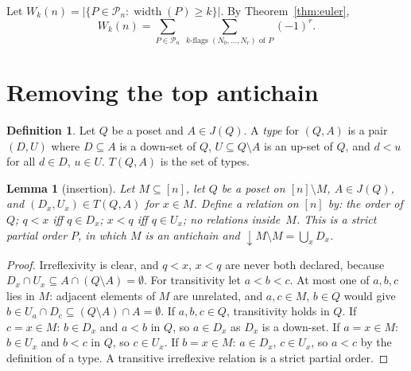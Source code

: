 \documentclass[11pt]{article}
\newtheorem{lemma}[theorem]{Lemma}
\theoremstyle{definition}
\newtheorem{definition}[theorem]{Definition}
\theoremstyle{remark}
\newcommand{\dn}{{\downarrow}}
\newcommand{\cP}{\mathcal{P}}
\DeclareMathOperator{\width}{width}
\begin{document}
Let $W_k(n)=|\{P\in\cP_n:\width(P)\ge k\}|$. By Theorem~\ref{thm:euler},
\begin{equation}\label{eq:W}
  W_k(n)=\sum_{P\in\cP_n}\ \sum_{\text{$k$-flags }(N_0,\dots,N_r)\text{ of }P}(-1)^r .
\end{equation}

\section{Removing the top antichain}

\begin{definition}
Let $Q$ be a poset and $A\in J(Q)$. A \emph{type} for $(Q,A)$ is a pair $(D,U)$ where
$D\subseteq A$ is a down-set of $Q$, $U\subseteq Q\setminus A$ is an up-set of $Q$, and
$d<u$ for all $d\in D$, $u\in U$. $T(Q,A)$ is the set of types.
\end{definition}

\begin{lemma}[insertion]\label{lem:ins}
Let $M\subseteq[n]$, let $Q$ be a poset on $[n]\setminus M$, $A\in J(Q)$, and
$(D_x,U_x)\in T(Q,A)$ for $x\in M$. Define a relation on $[n]$ by: the order of $Q$;
$q<x$ iff $q\in D_x$; $x<q$ iff $q\in U_x$; no relations inside~$M$. This is a strict
partial order $P$, in which $M$ is an antichain and $\dn M\setminus M=\bigcup_x D_x$.
\end{lemma}
\begin{proof}
Irreflexivity is clear, and $q<x$, $x<q$ are never both declared, because
$D_x\cap U_x\subseteq A\cap(Q\setminus A)=\emptyset$. For transitivity let $a<b<c$.
At most one of $a,b,c$ lies in $M$: adjacent elements of $M$ are unrelated, and
$a,c\in M$, $b\in Q$ would give $b\in U_a\cap D_c\subseteq(Q\setminus A)\cap A=\emptyset$.
If $a,b,c\in Q$, transitivity holds in $Q$.
If $c=x\in M$: $b\in D_x$ and $a<b$ in $Q$, so $a\in D_x$ as $D_x$ is a down-set.
If $a=x\in M$: $b\in U_x$ and $b<c$ in $Q$, so $c\in U_x$.
If $b=x\in M$: $a\in D_x$, $c\in U_x$, so $a<c$ by the definition of a type.
A transitive irreflexive relation is a strict partial order.
\end{proof}
\end{document}
